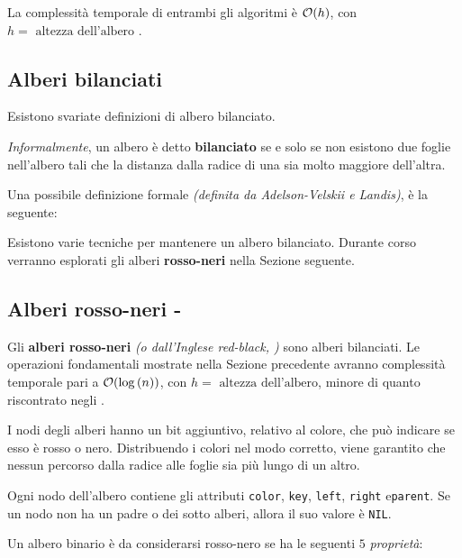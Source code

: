 \documentclass[italian, 10pt]{article}
\begin{document}
\bigskip
La complessità temporale di entrambi gli algoritmi è \(\mathcal{O}(h)\), con \(h = \text{ altezza dell'albero }\).

\subsection{Alberi bilanciati}

Esistono svariate definizioni di albero bilanciato.

\textit{Informalmente}, un albero è detto \textbf{bilanciato} se e solo se non esistono due foglie nell'albero tali che la distanza dalla radice di una sia molto maggiore dell'altra.

Una possibile definizione formale \textit{(definita da Adelson-Velskii e Landis)}, è la seguente:


Esistono varie tecniche per mantenere un albero bilanciato.
Durante corso verranno esplorati gli alberi \textbf{rosso-neri} nella Sezione seguente.

\subsection{Alberi rosso-neri - \RB}
\label{sec:alberi-rosso-neri}

Gli \textbf{alberi rosso-neri} \textit{(o dall'Inglese red-black, \RB)} sono alberi bilanciati.
Le operazioni fondamentali mostrate nella Sezione precedente avranno complessità temporale pari a \(\mathcal{O}(\log{(n)})\), con \(h = \text{ altezza dell'albero}\), minore di quanto riscontrato negli \BST.

I nodi degli alberi \RB hanno un bit aggiuntivo, relativo al colore, che può indicare se esso è rosso o nero.
Distribuendo i colori nel modo corretto, viene garantito che nessun percorso dalla radice alle foglie sia più lungo di un altro.

Ogni nodo dell'albero contiene gli attributi \texttt{color}, \texttt{key}, \texttt{left}, \texttt{right} e\texttt{parent}.
Se un nodo non ha un padre o dei sotto alberi, allora il suo valore è \texttt{NIL}.

Un albero binario è da considerarsi rosso-nero se ha le seguenti \(5\) \textit{proprietà}:
\end{document}
